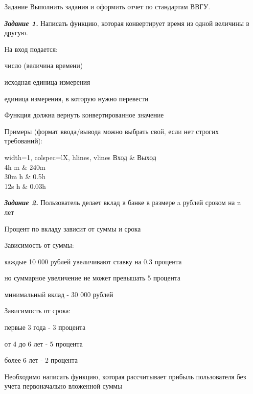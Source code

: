 \documentclass{vvsu}
\begin{document}
\begin{addition}{Задание}
  Выполнить задания и оформить отчет по стандартам ВВГУ.

  \textit{\textbf{Задание 1.}}
  Написать функцию, которая конвертирует время из одной величины в другую.
  
  На вход подается:
  \begin{vvsu_itemize}
    \item число (величина времени)
    \item исходная единица измерения
    \item единица измерения, в которую нужно перевести
  \end{vvsu_itemize}
  Функция должна вернуть конвертированное значение

  Примеры (формат ввода/вывода можно выбрать свой, если нет строгих требований):
  \begin{vvsu_table}{}
  \label{table:space_terms}
  \begin{tblr}{
    width=1\linewidth,
    colspec={lX},
    hlines, vlines
  }
  Вход	   & Выход \\
  4h m	   & 240m \\
  30m h    & 0.5h \\
  12s h	   & 0.03h \\
  \end{tblr}
  \end{vvsu_table}

  \textit{\textbf{Задание 2.}}  
  Пользователь делает вклад в банке в размере a рублей сроком на n лет

  Процент по вкладу зависит от суммы и срока

  Зависимость от суммы:
  \begin{vvsu_itemize}
    \item каждые 10 000 рублей увеличивают ставку на 0.3 процента
    \item но суммарное увеличение не может превышать 5 процента
    \item минимальный вклад - 30 000 рублей
  \end{vvsu_itemize}

  Зависимость от срока:
  \begin{vvsu_itemize}
    \item первые 3 года - 3 процента
    \item от 4 до 6 лет - 5 процента
    \item более 6 лет - 2 процента
  \end{vvsu_itemize}
  Необходимо написать функцию, которая рассчитывает прибыль пользователя без учета первоначально вложенной суммы


\end{addition}
\end{document}
